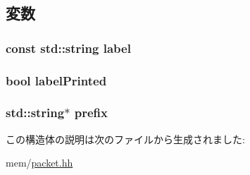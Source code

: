 \subsection{変数}
\hypertarget{structPacket_1_1PrintReqState_1_1LabelStackEntry_ae471a4c4073716b769170188214fe93d}{
\subsubsection[{label}]{\setlength{\rightskip}{0pt plus 5cm}const std::string {\bf label}}}
\label{structPacket_1_1PrintReqState_1_1LabelStackEntry_ae471a4c4073716b769170188214fe93d}
\hypertarget{structPacket_1_1PrintReqState_1_1LabelStackEntry_a22c23d7ca10090672c77c87d2f1e0a15}{
\subsubsection[{labelPrinted}]{\setlength{\rightskip}{0pt plus 5cm}bool {\bf labelPrinted}}}
\label{structPacket_1_1PrintReqState_1_1LabelStackEntry_a22c23d7ca10090672c77c87d2f1e0a15}
\hypertarget{structPacket_1_1PrintReqState_1_1LabelStackEntry_a7cea951e64ac35a854019b66b9105b19}{
\subsubsection[{prefix}]{\setlength{\rightskip}{0pt plus 5cm}std::string$\ast$ {\bf prefix}}}
\label{structPacket_1_1PrintReqState_1_1LabelStackEntry_a7cea951e64ac35a854019b66b9105b19}


この構造体の説明は次のファイルから生成されました:\begin{DoxyCompactItemize}
\item 
mem/\hyperlink{packet_8hh}{packet.hh}\end{DoxyCompactItemize}
